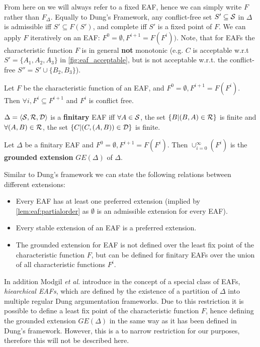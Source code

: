 From here on we will always refer to a fixed \gls{EAF}, hence we can simply write $F$ rather than $F_\Delta$. Equally to Dung's Framework, any conflict-free set $S' \subseteq \S$ in $\Delta$ is admissible iff $S' \subseteq F(S')$, and complete iff $S'$ is a fixed point of $F$. We can apply $F$ iteratively on an \gls{EAF}: $F^0 = \emptyset, F^{i+1} = F(F^i))$. Note, that for \glspl{EAF} the characteristic function $F$ is in general \textbf{not} monotonic (e.g. $C$ is acceptable w.r.t $S'= \{A_1, A_2, A_3\}$ in \autoref{fig:eaf_acceptable}, but is not acceptable w.r.t. the conflict-free $S'' = S' \cup \{B_2, B_3\}$).
\begin{lemma}
Let $F$ be the characteristic function of an \gls{EAF}, and $F^0 = \emptyset, F^{i+1} = F(F^i)$. Then $\forall i, F^i \subseteq F^{i+1}$ and $F^i$ is conflict free.
\end{lemma}


\begin{definition}
	$\Delta = \langle \S, \R, \D \rangle$ is a \textbf{finitary} \gls{EAF} iff $\forall A \in \S$, the set $\{B | (B, A) \in \R\}$ is finite and $\forall (A, B) \in \R$, the set $\{C | (C, (A, B))\in \D\}$ is finite.
\end{definition}

\begin{definition}
	Let $\Delta$ be a finitary \gls{EAF} and $F^0 = \emptyset, F^{i+1} = F(F^i)$. Then $\cup_{i=0}^\infty(F^i)$ is the \textbf{grounded extension} $GE(\Delta)$ of $\Delta$.
\end{definition}


\begin{remark}
Similar to Dung's framework we can state the following relations between different extensions:
\begin{itemize}
	\item Every \gls{EAF} has at least one preferred extension (implied by \autoref{lem:eaf:partialorder} as $\emptyset$ is an admissible extension for every \gls{EAF}).
	\item Every stable extension of an \gls{EAF} is a preferred extension.
	\item The grounded extension for \gls{EAF} is not defined over the least fix point of the characteristic function $F$, but can be defined for finitary \glspl{EAF} over the union of all characteristic functions $F^i$.
\end{itemize}	
\end{remark}

In addition Modgil \textit{et al.} introduce in \cite{Modgil2009} the concept of a special class of \glspl{EAF}, \textit{hiearchical \glspl{EAF}}, which are defined by the existence of a partition of $\Delta$ into multiple regular Dung argumentation frameworks. Due to this restriction it is possible to define a least fix point of the characteristic function $F$, hence defining the grounded extension $GE(\Delta)$ in the same way as it has been defined in Dung's framework. However, this is a to narrow restriction for our purposes, therefore this will not be described here. 


